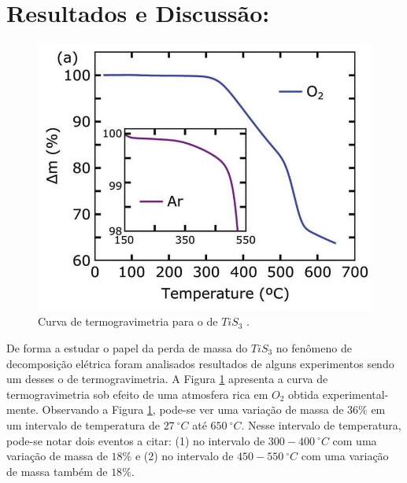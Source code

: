 \documentclass[11pt]{article}
\begin{document}
\section{Resultados e Discussão:}
\label{sec:org133e89a}
\begin{figure}[!htbp]
\centering\includegraphics[scale=0.35]{figures/var-massa-temp.jpg}
\caption{Curva de termogravimetria para o  de $TiS_3$ .}
\label{f1}
\end{figure}

De forma a estudar o papel da perda de massa do \(TiS_3\) no fenômeno de decomposição elétrica foram analisados resultados de alguns experimentos sendo um desses o de termogravimetria. A Figura \ref{f1} apresenta a curva de termogravimetria sob efeito de uma atmosfera rica em \(O_2\) obtida experimental- \linebreak mente\cite{molina2017high}. Observando a Figura \ref{f1}, pode-se ver uma variação de massa de \(36\%\) em um intervalo de temperatura de \(27~^\circ C\) até \(650~^\circ C\). Nesse intervalo de temperatura, pode-se notar dois eventos a citar: (1) no intervalo de  \(300-400~^\circ C\) com uma variação de massa de \(18\%\) e (2) no intervalo de \(450-550~^\circ C\) com uma variação de massa também de \(18\%\).
\end{document}

